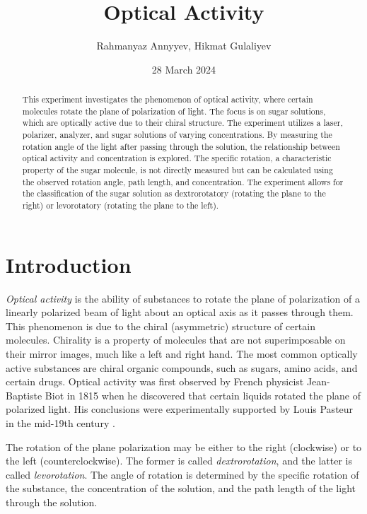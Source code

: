 \documentclass[10pt]{article}
\title{Optical Activity}
\author{Rahmanyaz Annyyev, Hikmat Gulaliyev}
\date{28 March 2024}
\begin{document}
\maketitle

\begin{abstract}

This experiment investigates the phenomenon of optical activity, where certain molecules rotate the plane of polarization of light. The focus is on sugar solutions, which are optically active due to their chiral structure. The experiment utilizes a laser, polarizer, analyzer, and sugar solutions of varying concentrations. By measuring the rotation angle of the light after passing through the solution, the relationship between optical activity and concentration is explored. The specific rotation, a characteristic property of the sugar molecule, is not directly measured but can be calculated using the observed rotation angle, path length, and concentration. The experiment allows for the classification of the sugar solution as dextrorotatory (rotating the plane to the right) or levorotatory (rotating the plane to the left).

\end{abstract}

\section{Introduction}

\textit{Optical activity} is the ability of substances to rotate the plane of polarization of a linearly polarized beam of light about an optical axis as it passes through them. This phenomenon is due to the chiral (asymmetric) structure of certain molecules. Chirality is a property of molecules that are not superimposable on their mirror images, much like a left and right hand. The most common optically active substances are chiral organic compounds, such as sugars, amino acids, and certain drugs. Optical activity was first observed by French physicist Jean-Baptiste Biot in 1815 when he discovered that certain liquids rotated the plane of polarized light. His conclusions were experimentally supported by Louis Pasteur in the mid-19th century \cite{Petrucci_2017}.

The rotation of the plane polarization may be either to the right (clockwise) or to the left (counterclockwise). The former is called \textit{dextrorotation}, and the latter is called \textit{levorotation}. The angle of rotation is determined by the specific rotation of the substance, the concentration of the solution, and the path length of the light through the solution.
\end{document}
